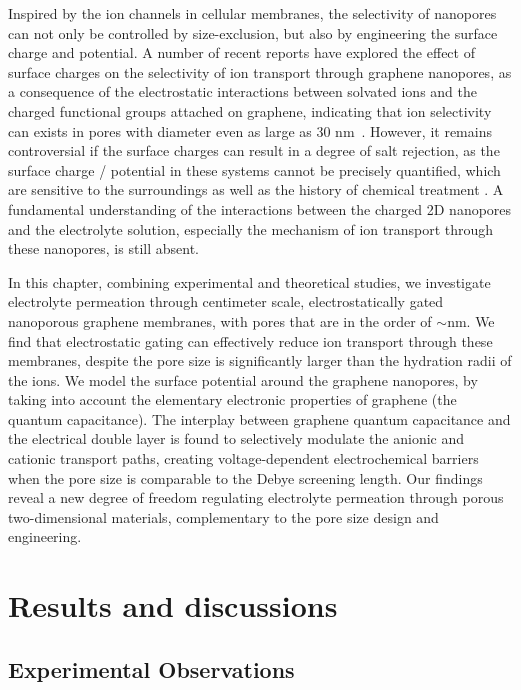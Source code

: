Inspired by the ion channels in cellular membranes, the
selectivity of nanopores can not only be controlled by size-exclusion,
but also by engineering the surface charge and potential.
%
A number of recent reports have explored the effect of surface charges
on the selectivity of ion transport through graphene nanopores, as a
consequence of the electrostatic interactions between solvated ions
and the charged functional groups attached on graphene, indicating
that ion selectivity can exists in pores with diameter even as large
as 30 nm~\cite{Rollings_2016_gating,Surwade_2014_carbon_electrochemical_ion}.
%
However, it remains controversial if the surface charges can result in
a degree of salt rejection, as the surface charge / potential in these systems
cannot be precisely quantified, which are sensitive to the surroundings
as well as the history of chemical treatment
\cite{Li_2008_gr_suspension}.
%
A fundamental understanding of the interactions between the charged 2D
nanopores and the electrolyte solution, especially the mechanism of
ion transport through these nanopores, is still absent.

In this chapter, combining experimental and theoretical studies, we
investigate electrolyte permeation through centimeter scale,
electrostatically gated nanoporous graphene membranes, with pores that
are in the order of $\sim{}$\unit[20]{nm}.
%
We find that electrostatic gating can effectively reduce ion transport
through these membranes, despite the pore size is significantly larger
than the hydration radii of the ions. We model the surface potential
around the graphene nanopores, by taking into account the elementary
electronic properties of graphene (\eg the quantum capacitance).
%
The interplay between graphene quantum capacitance and the electrical
double layer is found to selectively modulate the anionic and cationic
transport paths, creating voltage-dependent electrochemical barriers
when the pore size is comparable to the Debye screening length. Our findings
reveal a new degree of freedom regulating electrolyte permeation
through porous two-dimensional materials, complementary to the pore
size design and engineering.

\section{Results and discussions}
\label{sec:np-np-res}

\subsection{Experimental Observations}
\label{sec:np-np-exper-observ}

